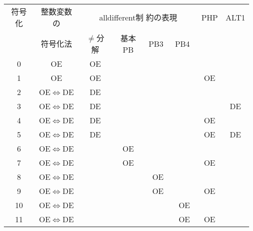  \begin{tabular}[c] {c|c|c|c|c|c|c|c}
  符号化 & 整数変数の            & \multicolumn{4}{|c|}{alldifferent制
                                   約の表現} & PHP & ALT1 \\\cline{3-6}
        & 符号化法              & $\neq$分解 & 基本PB & PB3~\cite{Ono19:ai} & PB4~\cite{Ono19:ai} & & \\\hline
  0     & OE                    & OE      &    &       &             &     &      \\
  1     & OE                    & OE      &    &       &             & OE  &      \\
  2     & OE$\Leftrightarrow$DE & DE      &    &       &             &     &      \\
  3     & OE$\Leftrightarrow$DE & DE      &    &       &             &     & DE   \\
  4     & OE$\Leftrightarrow$DE & DE      &    &       &             & OE  &      \\
  5     & OE$\Leftrightarrow$DE & DE      &    &       &             & OE  & DE   \\
  6     & OE$\Leftrightarrow$DE &         & OE &       &             &     &      \\
  7     & OE$\Leftrightarrow$DE &         & OE &       &             & OE  &      \\
  8     & OE$\Leftrightarrow$DE &         &    & OE    &             &     &      \\
  9     & OE$\Leftrightarrow$DE &         &    & OE    &             & OE  &      \\
  10    & OE$\Leftrightarrow$DE &         &    &       & OE          &     &      \\
  11    & OE$\Leftrightarrow$DE &         &    &       & OE          & OE  &      \\\hline
 \end{tabular}
